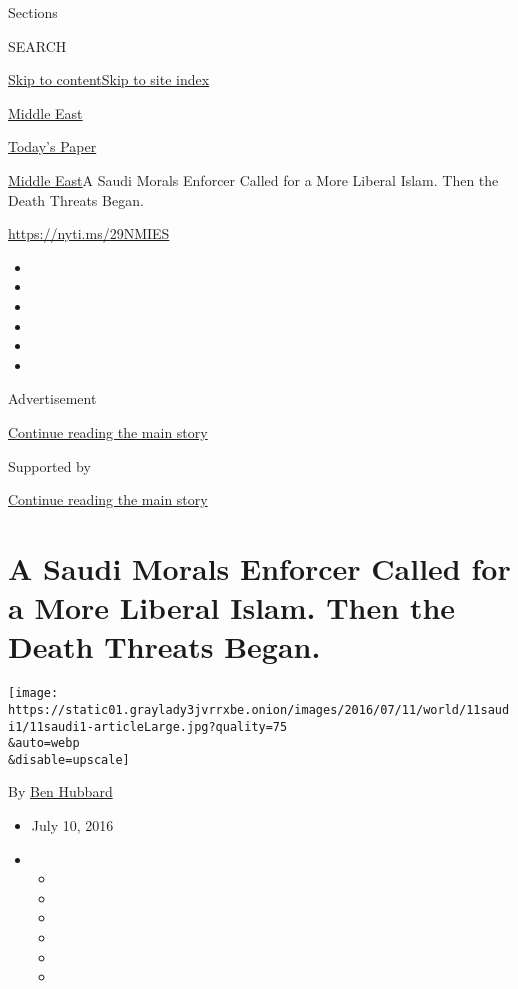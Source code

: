 Sections

SEARCH

\protect\hyperlink{site-content}{Skip to
content}\protect\hyperlink{site-index}{Skip to site index}

\href{https://www.nytimes3xbfgragh.onion/section/world/middleeast}{Middle
East}

\href{https://myaccount.nytimes3xbfgragh.onion/auth/login?response_type=cookie\&client_id=vi}{}

\href{https://www.nytimes3xbfgragh.onion/section/todayspaper}{Today's
Paper}

\href{/section/world/middleeast}{Middle East}\textbar{}A Saudi Morals
Enforcer Called for a More Liberal Islam. Then the Death Threats Began.

\url{https://nyti.ms/29NMIES}

\begin{itemize}
\item
\item
\item
\item
\item
\item
\end{itemize}

Advertisement

\protect\hyperlink{after-top}{Continue reading the main story}

Supported by

\protect\hyperlink{after-sponsor}{Continue reading the main story}

\hypertarget{a-saudi-morals-enforcer-called-for-a-more-liberal-islam-then-the-death-threats-began}{%
\section{A Saudi Morals Enforcer Called for a More Liberal Islam. Then
the Death Threats
Began.}\label{a-saudi-morals-enforcer-called-for-a-more-liberal-islam-then-the-death-threats-began}}

\texttt{[image: https://static01.graylady3jvrrxbe.onion/images/2016/07/11/world/11saudi1/11saudi1-articleLarge.jpg?quality=75\\\&auto=webp\\\&disable=upscale]}

By \href{http://www.nytimes3xbfgragh.onion/by/ben-hubbard}{Ben Hubbard}

\begin{itemize}
\item
  July 10, 2016
\item
  \begin{itemize}
  \item
  \item
  \item
  \item
  \item
  \item
  \end{itemize}
\end{itemize}

